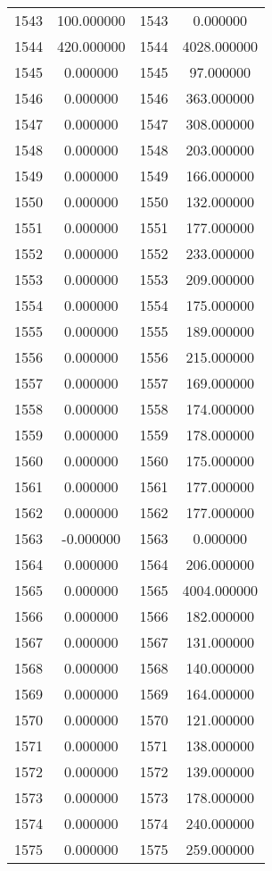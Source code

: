 \documentclass[12pt]{article}
\begin{document}
\begin{longtable}{@{}cccc@{}}
1543 & 100.000000 & 1543 & 0.000000 \\
1544 & 420.000000 & 1544 & 4028.000000 \\
1545 & 0.000000 & 1545 & 97.000000 \\
1546 & 0.000000 & 1546 & 363.000000 \\
1547 & 0.000000 & 1547 & 308.000000 \\
1548 & 0.000000 & 1548 & 203.000000 \\
1549 & 0.000000 & 1549 & 166.000000 \\
1550 & 0.000000 & 1550 & 132.000000 \\
1551 & 0.000000 & 1551 & 177.000000 \\
1552 & 0.000000 & 1552 & 233.000000 \\
1553 & 0.000000 & 1553 & 209.000000 \\
1554 & 0.000000 & 1554 & 175.000000 \\
1555 & 0.000000 & 1555 & 189.000000 \\
1556 & 0.000000 & 1556 & 215.000000 \\
1557 & 0.000000 & 1557 & 169.000000 \\
1558 & 0.000000 & 1558 & 174.000000 \\
1559 & 0.000000 & 1559 & 178.000000 \\
1560 & 0.000000 & 1560 & 175.000000 \\
1561 & 0.000000 & 1561 & 177.000000 \\
1562 & 0.000000 & 1562 & 177.000000 \\
1563 & -0.000000 & 1563 & 0.000000 \\
1564 & 0.000000 & 1564 & 206.000000 \\
1565 & 0.000000 & 1565 & 4004.000000 \\
1566 & 0.000000 & 1566 & 182.000000 \\
1567 & 0.000000 & 1567 & 131.000000 \\
1568 & 0.000000 & 1568 & 140.000000 \\
1569 & 0.000000 & 1569 & 164.000000 \\
1570 & 0.000000 & 1570 & 121.000000 \\
1571 & 0.000000 & 1571 & 138.000000 \\
1572 & 0.000000 & 1572 & 139.000000 \\
1573 & 0.000000 & 1573 & 178.000000 \\
1574 & 0.000000 & 1574 & 240.000000 \\
1575 & 0.000000 & 1575 & 259.000000 \\

\end{longtable}
\end{document}
